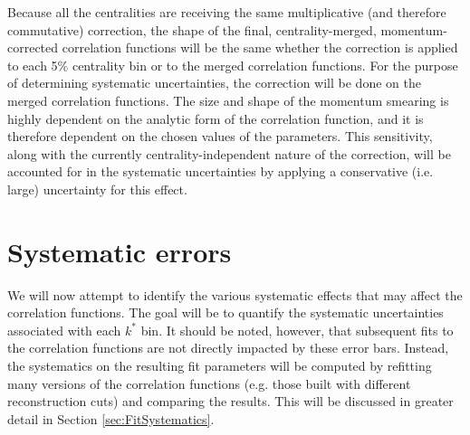 Because all the centralities are receiving the same multiplicative (and therefore commutative) correction, the shape of the final, centrality-merged, momentum-corrected correlation functions will be the same whether the correction is applied to each 5\% centrality bin or to the merged correlation functions.  For the purpose of determining systematic uncertainties, the correction will be done on the merged correlation functions.  The size and shape of the momentum smearing is highly dependent on the analytic form of the correlation function, and it is therefore dependent on the chosen values of the parameters.  This sensitivity, along with the currently centrality-independent nature of the correction, will be accounted for in the systematic uncertainties by applying a conservative (i.e. large) uncertainty for this effect.  

\section{Systematic errors}
\label{sec:GeneralCfSysErrorDiscussion}

We will now attempt to identify the various systematic effects that may affect the correlation functions.  The goal will be to quantify the systematic uncertainties associated with each $k^*$ bin.  It should be noted, however, that subsequent fits to the correlation functions are not directly impacted by these error bars.  Instead, the systematics on the resulting fit parameters will be computed by refitting many versions of the correlation functions (e.g. those built with different reconstruction cuts) and comparing the results. This will be discussed in greater detail in Section \ref{sec:FitSystematics}.

